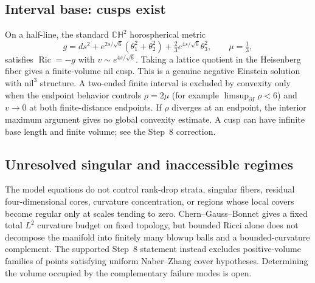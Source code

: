\subsection*{Interval base: cusps exist}
On a half-line, the standard $\mathbb{CH}^2$ horospherical metric
\[
 g=ds^2+e^{2s/\sqrt6}(\theta_1^2+\theta_2^2)
   +\tfrac23e^{4s/\sqrt6}\theta_3^2,
 \qquad\mu=\tfrac13,
\]
satisfies $\operatorname{Ric}=-g$ with $v\sim e^{4s/\sqrt6}$.
Taking a lattice quotient in the Heisenberg fiber gives a finite-volume
nil cusp.  This is a genuine negative Einstein solution with
$\text{nil}^3$ structure.  A two-ended finite interval is excluded by
convexity only when the endpoint behavior controls $\rho=2\mu$ (for example
$\limsup_{\partial I}\rho<6$) and $v\to0$ at both finite-distance endpoints.
If $\rho$ diverges at an endpoint, the interior maximum argument gives no
global convexity estimate.  A cusp can have infinite base length and finite
volume; see the Step~8 correction.

\subsection*{Unresolved singular and inaccessible regimes}
The model equations do not control rank-drop strata, singular fibers,
residual four-dimensional cores, curvature concentration, or regions whose
local covers become regular only at scales tending to zero.  Chern--Gauss--Bonnet
gives a fixed total $L^2$ curvature budget on fixed topology, but bounded Ricci
alone does not decompose the manifold into finitely many blowup balls and a
bounded-curvature complement.  The supported Step~8 statement instead excludes
positive-volume families of points satisfying uniform Naber--Zhang cover
hypotheses.  Determining the volume occupied by the complementary failure modes
is open.

